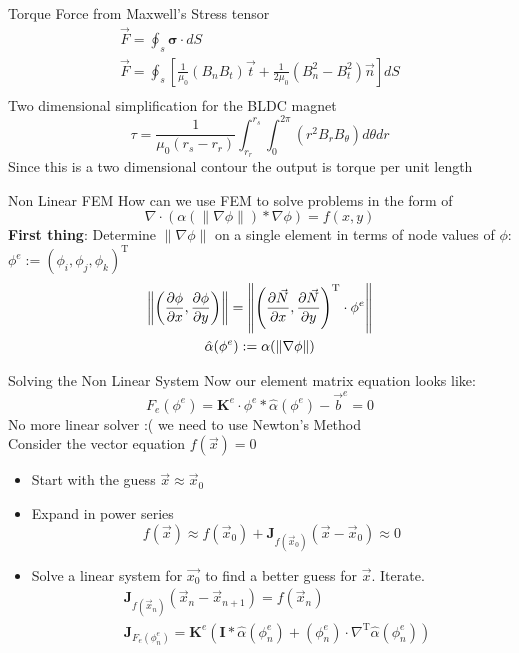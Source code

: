 \documentclass{beamer}
\newcommand\norm[1]{\left\lVert#1\right\rVert}
\begin{document}
    \begin{frame}{Torque}
        Force from Maxwell's Stress tensor
        \begin{gather*}
            \vec{F}=\oint_{s} \mathbf{\sigma} \cdot d S\\
            \vec{F}=\oint_{s}\left[\frac{1}{\mu_{0}}\left(B_{n} B_{t}\right) \vec{t}+\frac{1}{2 \mu_{0}}\left(B_{n}^{2}-B_{t}^{2}\right) \vec{n}\right] d S\\
        \end{gather*}
        Two dimensional simplification for the BLDC magnet
        \begin{equation*}
            \tau=\frac{1}{\mu_{0}\left(r_{s}-r_{r}\right)} \int_{r_{r}}^{r_{s}} \int_{0}^{2 \pi}\left(r^2 B_{r} B_{\theta}\right) d\theta dr
        \end{equation*}
        Since this is a two dimensional contour the output is torque per unit length
    \end{frame}
    \begin{frame}{Non Linear FEM}
        How can we use FEM to solve problems in the form of
        \[\nabla\cdot\left(\alpha(\|\nabla\phi\|)*\nabla\phi\right)=f(x,y)\]
        \textbf{First thing}: Determine $\|\nabla\phi\|$ on a single element in terms of node values of $\phi$: $\phi^{e}:=\left( \phi_i, \phi_j, \phi_k \right)^{\text{T}}$
        \begin{gather*}
            \norm{\left(\pdv{\phi}{x},\pdv{\phi}{y}\right)}=\norm{\left(\pdv{\vec{N}}{x}, \pdv{\vec{N}}{y} \right)^{\text{T}}\cdot \phi^{e}}\\
            \hat{\alpha}(\phi^e):=\alpha(\norm{\nabla\phi})
        \end{gather*}
    \end{frame}
    \begin{frame}{Solving the Non Linear System}
        Now our element matrix equation looks like:
        \[F_e(\phi^{e})=\mathbf{K}^e\cdot \phi^e*\hat{\alpha}(\phi^{e})-\vec{b}^e=0\]
        No more linear solver :( we need to use Newton's Method\\
        \smallbreak
        Consider the vector equation $f(\vec{x})=0$
        \begin{itemize}
            \item Start with the guess $\vec{x}\approx\vec{x}_0$
            \item Expand in power series
            \[f(\vec{x})\approx f(\vec{x}_0)+\mathbf{J}_{f(\vec{x}_0)}(\vec{x}-\vec{x}_0)\approx 0\]
            \item Solve a linear system for $\vec{x_0}$ to find a better guess for $\vec{x}$.
            Iterate.
            \begin{align*}
                &\mathbf{J}_{f(\vec{x}_n)}\left(\vec{x}_{n}-\vec{x}_{n+1}\right)=f(\vec{x}_{n})\\
                &\mathbf{J}_{F_e(\phi_n^e)}=\mathbf{K}^e\left( \mathbf{I}*\hat{\alpha}(\phi_n^e)+\left(\phi_n^e\right)\cdot \nabla^{\text{T}}\hat{\alpha}(\phi_n^e) \right)\\
            \end{align*}
        \end{itemize}
    \end{frame}
\end{document}

